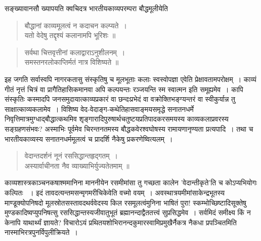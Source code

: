 {\dev सङ्ख्यावानसौ ख्यापयति क्वचिदत्र भारतीयकाव्यपरम्परा बौद्धमूलीयेति}
\begin{quote}
{\dev बौद्धानां काव्यमूलत्वं न कदाचन कल्प्यते~।}\\
{\dev यतो वेदेषु तद्दृश्यं कलानामपि भूरिशः ॥}
\end{quote}
\begin{quote}
{\dev सर्वथा चित्तवृत्तीनां कलाद्वाराऽनुशीलनम्~।}\\
{\dev समस्तनरलोकाप्तिर्मतं नात्र विशिष्यते ॥}
\end{quote}

{\dev इह जगति सर्वास्वपि नागरकतासु संस्कृतिषु च मूलभूताः कलाः स्वस्वोपज्ञा एवेति प्रेक्षावता\-मपरोक्षम्~। काव्यं गीतं नृत्तं चित्रं वा प्रागैतिहासिकमानवा अपि कल्पयन्तः रञ्जयन्ति स्म स्वात्मन इति समूह्यमेव~। कापि संस्कृतिः कस्मादपि जनसमुदायात्काव्यप्रकारं वा छन्दःप्रभेदं वा वक्रोक्तिभङ्ग्यन्तरं वा स्वीकुर्यान्न तु साक्षात्काव्यकलामेव~। विशिष्य वेद-वेदाङ्ग-कथेतिहास\-वाङ्मयसमृद्धे सनातनधर्मे निवृत्तिमात्रमुग्धाद्बौद्धात्कथमिव शृङ्गारादिपुरुषार्थचतुष्टयप्रतिपाद\-करसमयस्य काव्यकलाप्रवरस्य सङ्ग्रहणसंभवः? अस्माभिः पूर्वमेव चिरन्तनतमस्य बौद्ध\-कवेरश्वघोषस्य रामायणानृण्यता प्रत्यपादि~। तथा च भारतीयकाव्यस्य सनातनधर्ममूलत्वं च प्रादर्शि नैकेषु प्रकरणेष्वित्यलम्~।}
\begin{quote}
{\dev वेदान्तदर्शनं नूनं रससिद्धान्तहृद्गतम्~।}\\
{\dev अस्यार्वाचीनता नैव व्याख्याभिर्युज्यतेतमाम् ॥}
\end{quote}

{\dev काव्यशास्त्रकाञ्चनकषाश्ममानिना माननीयेन रसमीमांसा तु गच्छता कालेन ’वेदान्तीकृते’ति च कोऽप्यभियोगः कल्पितः} {\dev~। इदं तावदत्यन्तमसन्मृगमरीचि\-केवेति वच्मो वयम्~। अवस्था\-त्रयमीमांसाकेन्द्रभूतस्य माण्डूक्योपनिषदो मूलस्रोतसस्तावद\-थर्ववेदस्य किल रसमूलत्वं\break मुनिना भाषितं पुरा! स्कम्भोच्छिष्टादिसूक्तेषु मुण्डकादिष्वप्युपनि\-षत्सु रस\-सिद्धान्तस्य\break जीवातुभूतं ब्रह्मानन्दाद्वैततत्त्वं सुप्रसिद्धमेव~। सर्वमिदं समीक्ष्य किं न केनापि याथार्थ्यं ज्ञायते? विचारोऽयं प्रथितयशोभिरानन्दकुमारस्वामिप्रमुखैर्नैकत्र नैकधा प्रपञ्चितमिति नास्माभिरत्र\break पुनर्विपुलीक्रियते~।}   

